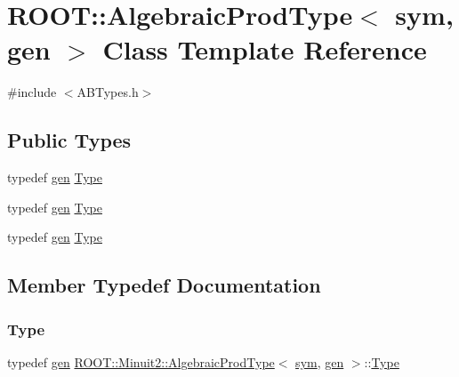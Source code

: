 \hypertarget{classROOT_1_1Minuit2_1_1AlgebraicProdType_3_01sym_00_01gen_01_4}{}\section{R\+O\+OT\+:\+:Algebraic\+Prod\+Type$<$ sym, gen $>$ Class Template Reference}
\label{classROOT_1_1Minuit2_1_1AlgebraicProdType_3_01sym_00_01gen_01_4}


{\ttfamily \#include $<$A\+B\+Types.\+h$>$}

\subsection*{Public Types}
\begin{DoxyCompactItemize}
\item 
typedef \mbox{\hyperlink{classROOT_1_1Minuit2_1_1gen}{gen}} \mbox{\hyperlink{classROOT_1_1Minuit2_1_1AlgebraicProdType_3_01sym_00_01gen_01_4_a963501c089513f1dfae4655d38218487}{Type}}
\item 
typedef \mbox{\hyperlink{classROOT_1_1Minuit2_1_1gen}{gen}} \mbox{\hyperlink{classROOT_1_1Minuit2_1_1AlgebraicProdType_3_01sym_00_01gen_01_4_a963501c089513f1dfae4655d38218487}{Type}}
\item 
typedef \mbox{\hyperlink{classROOT_1_1Minuit2_1_1gen}{gen}} \mbox{\hyperlink{classROOT_1_1Minuit2_1_1AlgebraicProdType_3_01sym_00_01gen_01_4_a963501c089513f1dfae4655d38218487}{Type}}
\end{DoxyCompactItemize}


\subsection{Member Typedef Documentation}
\mbox{\label{classROOT_1_1Minuit2_1_1AlgebraicProdType_3_01sym_00_01gen_01_4_a963501c089513f1dfae4655d38218487}} 
\subsubsection{\texorpdfstring{Type}{Type}\hspace{0.1cm}{\footnotesize\ttfamily [1/3]}}
{\footnotesize\ttfamily typedef \mbox{\hyperlink{classROOT_1_1Minuit2_1_1gen}{gen}} \mbox{\hyperlink{classROOT_1_1Minuit2_1_1AlgebraicProdType}{R\+O\+O\+T\+::\+Minuit2\+::\+Algebraic\+Prod\+Type}}$<$ \mbox{\hyperlink{classROOT_1_1Minuit2_1_1sym}{sym}}, \mbox{\hyperlink{classROOT_1_1Minuit2_1_1gen}{gen}} $>$\+::\mbox{\hyperlink{classROOT_1_1Minuit2_1_1AlgebraicProdType_3_01sym_00_01gen_01_4_a963501c089513f1dfae4655d38218487}{Type}}}

